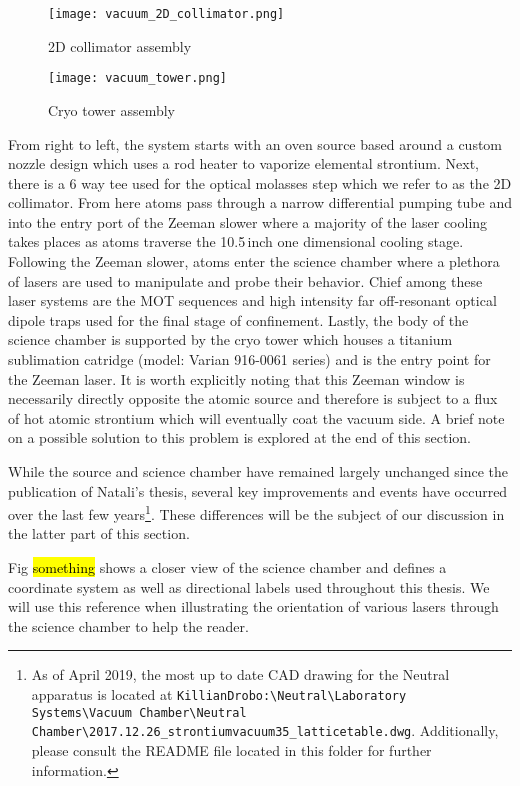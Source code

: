 	\begin{figure} 
		\centerline{
		\texttt{[image: vacuum\_2D\_collimator.png]}}
		\caption{2D collimator assembly}
		\label{fig:assembly_2Dcoll}
	\end{figure}
	
	\begin{figure} 
		\centerline{
		\texttt{[image: vacuum\_tower.png]}}
		\caption{Cryo tower assembly}
		\label{fig:cryoTower}
	\end{figure}
From right to left, the system starts with an oven source based around a custom nozzle design which uses a rod heater to vaporize elemental strontium.
Next, there is a 6 way tee used for the optical molasses step which we refer to as the 2D collimator. 
From here atoms pass through a narrow differential pumping tube and into the entry port of the Zeeman slower where a majority of the laser cooling takes places as atoms traverse the 10.5\,inch one dimensional cooling stage. 
Following the Zeeman slower, atoms enter the science chamber where a plethora of lasers are used to manipulate and probe their behavior.
Chief among these laser systems are the MOT sequences and high intensity far off-resonant optical dipole traps used for the final stage of confinement.
Lastly, the body of the science chamber is supported by the cryo tower which houses a titanium sublimation catridge (model: Varian 916-0061 series) and is the entry point for the Zeeman laser.
It is worth explicitly noting that this Zeeman window is necessarily directly opposite the atomic source and therefore is subject to a flux of hot atomic strontium which will eventually coat the vacuum side. A brief note on a possible solution to this problem is explored at the end of this section.

While the source and science chamber have remained largely unchanged since the publication of Natali's thesis, several key improvements and events have occurred over the last few years\footnote{As of April 2019, the most up to date CAD drawing for the Neutral apparatus is located at \texttt{KillianDrobo:\textbackslash Neutral\textbackslash Laboratory Systems\textbackslash Vacuum Chamber\textbackslash Neutral Chamber\textbackslash 2017.12.26\_strontiumvacuum35\_latticetable.dwg}. Additionally, please consult the README file located in this folder for further information.}.
These differences will be the subject of our discussion in the latter part of this section.


Fig \hl{something} shows a closer view of the science chamber and defines a coordinate system as well as directional labels used throughout this thesis. 
We will use this reference when illustrating the orientation of various lasers through the science chamber to help the reader.

